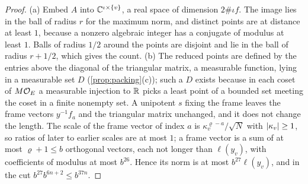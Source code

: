 \begin{proof}
(a) Embed $A$ into $\mathbb{C}^{\iota\times\{v\}}$, a real space of dimension $2\#\iota f$. The image lies in the ball of radius $r$ for the maximum norm, and distinct points are at distance at least $1$, because a
nonzero algebraic integer has a conjugate of modulus at least $1$. Balls of radius $1/2$ around the points are disjoint and lie in the ball of radius $r+1/2$, which gives the count. (b) The reduced points are
defined by the entries above the diagonal of the triangular matrix, a measurable function, lying in a measurable set $D$ (\cref{prop:packing}(c)); such a $D$ exists because in each coset of $M\mathcal{O}_E$ a measurable
injection to $\mathbb{R}$ picks a least point of a bounded set meeting the coset in a finite nonempty set. A unipotent $s$ fixing the frame leaves the frame vectors $y^{-1}f_a$ and the triangular matrix unchanged, and
it does not change the length. The scale of the frame vector of index $a$ is $\kappa_v^{\varrho-a}/\sqrt N$ with $\lvert \kappa_v\rvert\ge1$, so ratios of later to earlier scales are at most $1$; a frame vector is a sum of
at most $\varrho+1\le b$ orthogonal vectors, each not longer than $\ell(y_v)$, with coefficients of modulus at most $b^{26}$. Hence its norm is at most $b^{27}\ell(y_v)$, and in the cut $b^{27}b^{6n+2}\le b^{37n}$.
\end{proof}

